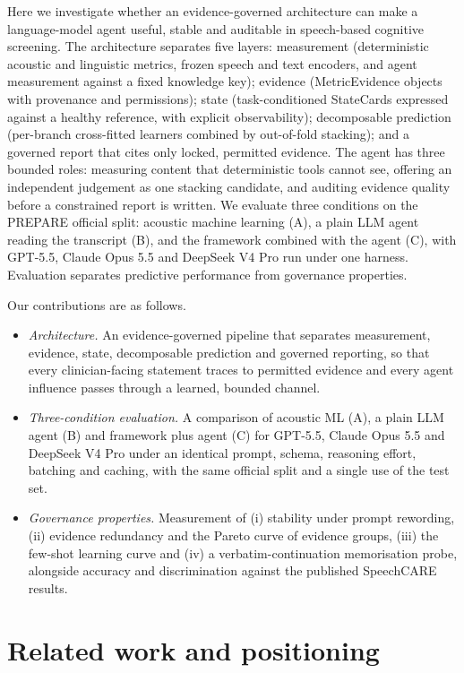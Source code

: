 \documentclass[pdflatex,sn-nature]{sn-jnl}
\begin{document}
Here we investigate whether an evidence-governed architecture can make a language-model agent useful, stable and auditable in speech-based cognitive screening. The architecture separates five layers: measurement (deterministic acoustic and linguistic metrics, frozen speech and text encoders, and agent measurement against a fixed knowledge key); evidence (MetricEvidence objects with provenance and permissions); state (task-conditioned StateCards expressed against a healthy reference, with explicit observability); decomposable prediction (per-branch cross-fitted learners combined by out-of-fold stacking); and a governed report that cites only locked, permitted evidence. The agent has three bounded roles: measuring content that deterministic tools cannot see, offering an independent judgement as one stacking candidate, and auditing evidence quality before a constrained report is written. We evaluate three conditions on the PREPARE official split: acoustic machine learning (A), a plain LLM agent reading the transcript (B), and the framework combined with the agent (C), with GPT-5.5, Claude Opus 5.5 and DeepSeek V4 Pro run under one harness. Evaluation separates predictive performance from governance properties.

Our contributions are as follows.
\begin{itemize}
\item \emph{Architecture.} An evidence-governed pipeline that separates measurement, evidence, state, decomposable prediction and governed reporting, so that every clinician-facing statement traces to permitted evidence and every agent influence passes through a learned, bounded channel.
\item \emph{Three-condition evaluation.} A comparison of acoustic ML (A), a plain LLM agent (B) and framework plus agent (C) for GPT-5.5, Claude Opus 5.5 and DeepSeek V4 Pro under an identical prompt, schema, reasoning effort, batching and caching, with the same official split and a single use of the test set.
\item \emph{Governance properties.} Measurement of (i) stability under prompt rewording, (ii) evidence redundancy and the Pareto curve of evidence groups, (iii) the few-shot learning curve and (iv) a verbatim-continuation memorisation probe, alongside accuracy and discrimination against the published SpeechCARE results.
\end{itemize}

\section{Related work and positioning}\label{sec:related}
\end{document}
